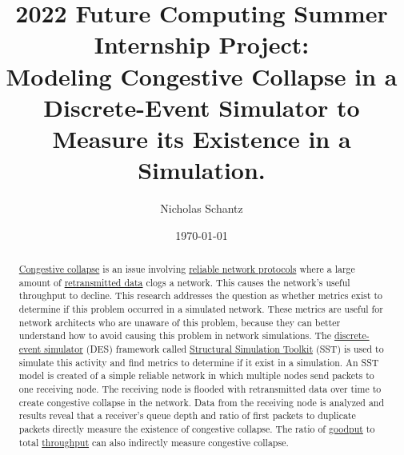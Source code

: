 \documentclass{article}
\begin{document}
    \begin{minipage}[h]{\textwidth}
        \title{2022 Future Computing Summer Internship Project:\\Modeling Congestive Collapse in a Discrete-Event Simulator to Measure its Existence in a Simulation.}
        \author{Nicholas Schantz}
        \date{\today}
            \maketitle
        \begin{abstract}
            \href{https://en.wikipedia.org/wiki/Network_congestion#Congestive_collapse}{Congestive collapse} is an issue involving \href{https://en.wikipedia.org/wiki/Reliability_(computer_networking}{reliable network protocols} where a large amount of \href{https://www.javatpoint.com/tcp-retransmission}{retransmitted data} clogs a network. This causes the network's useful throughput to decline. This research addresses the question as whether metrics exist to determine if this problem occurred in a simulated network. These metrics are useful for network architects who are unaware of this problem, because they can better understand how to avoid causing this problem in network simulations. The \href{https://en.wikipedia.org/wiki/Discrete-event_simulation}{discrete-event simulator} (DES) framework called \href{http://sst-simulator.org/}{Structural Simulation Toolkit} (SST) is used to simulate this activity and find metrics to determine if it exist in a simulation. An SST model is created of a simple reliable network in which multiple nodes send packets to one receiving node. The receiving node is flooded with retransmitted data over time to create congestive collapse in the network. Data from the receiving node is analyzed and results reveal that a receiver's queue depth and ratio of first packets to duplicate packets directly measure the existence of congestive collapse. The ratio of \href{https://en.wikipedia.org/wiki/Goodput}{goodput} to total \href{https://en.wikipedia.org/wiki/Network_throughput}{throughput} can also indirectly measure congestive collapse.
        \end{abstract}
    \end{minipage}

\ \\

\end{document}
